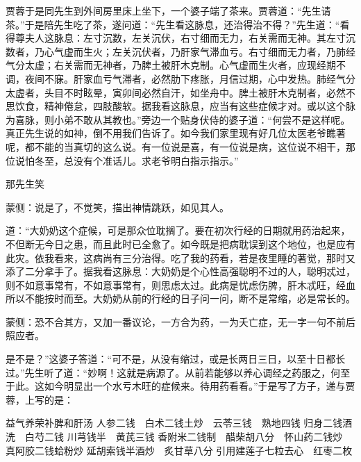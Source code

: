 \begin{parag}
    贾蓉于是同先生到外间房里床上坐下，一个婆子端了茶来。贾蓉道：“先生请茶。”于是陪先生吃了茶，遂问道：“先生看这脉息，还治得治不得？”先生道：“看得尊夫人这脉息：左寸沉数，左关沉伏，右寸细而无力，右关需而无神。其左寸沉数者，乃心气虚而生火；左关沉伏者，乃肝家气滞血亏。右寸细而无力者，乃肺经气分太虚；右关需而无神者，乃脾土被肝木克制。心气虚而生火者，应现经期不调，夜间不寐。肝家血亏气滞者，必然肋下疼胀，月信过期，心中发热。肺经气分太虚者，头目不时眩晕，寅卯间必然自汗，如坐舟中。脾土被肝木克制者，必然不思饮食，精神倦怠，四肢酸软。据我看这脉息，应当有这些症候才对。或以这个脉为喜脉，则小弟不敢从其教也。”旁边一个贴身伏侍的婆子道：“何尝不是这样呢。真正先生说的如神，倒不用我们告诉了。如今我们家里现有好几位太医老爷瞧著呢，都不能的当真切的这么说。有一位说是喜，有一位说是病，这位说不相干，那位说怕冬至，总没有个准话儿。求老爷明白指示指示。”
\end{parag}


\begin{parag}
    那先生笑\begin{note}蒙侧：说是了，不觉笑，描出神情跳跃，如见其人。\end{note}道：“大奶奶这个症候，可是那众位耽搁了。要在初次行经的日期就用药治起来，不但断无今日之患，而且此时已全愈了。如今既是把病耽误到这个地位，也是应有此灾。依我看来，这病尚有三分治得。吃了我的药看，若是夜里睡的著觉，那时又添了二分拿手了。据我看这脉息：大奶奶是个心性高强聪明不过的人，聪明忒过，则不如意事常有，不如意事常有，则思虑太过。此病是忧虑伤脾，肝木忒旺，经血所以不能按时而至。大奶奶从前的行经的日子问一问，断不是常缩，必是常长的。\begin{note}蒙侧：恐不合其方，又加一番议论，一方合为药，一为夭亡症，无一字一句不前后照应者。\end{note}是不是？”这婆子答道：“可不是，从没有缩过，或是长两日三日，以至十日都长过。”先生听了道：“妙啊！这就是病源了。从前若能够以养心调经之药服之，何至于此。这如今明显出一个水亏木旺的症候来。待用药看看。”于是写了方子，递与贾蓉，上写的是：
\end{parag}


\begin{qute2sp}
    益气养荣补脾和肝汤 \newline
    \indent 人参二钱　白术二钱土炒　云苓三钱　熟地四钱 \newline
    \indent 归身二钱酒洗　白芍二钱 川芎钱半　黄芪三钱 \newline
    \indent 香附米二钱制　醋柴胡八分　怀山药二钱炒　真阿胶二钱蛤粉炒 \newline
    \indent 延胡索钱半酒炒　炙甘草八分 \newline
    \indent 引用建莲子七粒去心　红枣二枚 \newline
\end{qute2sp}


